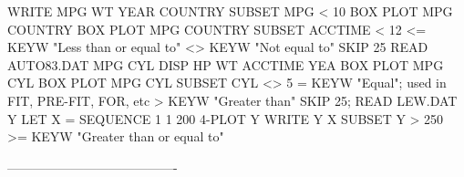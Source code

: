                                   WRITE MPG WT YEAR COUNTRY SUBSET MPG < 10
                                  BOX PLOT MPG COUNTRY
                                  BOX PLOT MPG COUNTRY SUBSET ACCTIME < 12
<=                          KEYW  "Less than or equal to"
<>                          KEYW  "Not equal to"
                                  SKIP 25
                                  READ AUTO83.DAT MPG CYL DISP HP WT ACCTIME YEA
                                  BOX PLOT MPG CYL
                                  BOX PLOT MPG CYL SUBSET CYL <> 5
=                           KEYW  "Equal"; used in FIT, PRE-FIT, FOR, etc
>                           KEYW  "Greater than"
                                  SKIP 25; READ LEW.DAT Y
                                  LET X = SEQUENCE 1 1 200
                                  4-PLOT Y
                                  WRITE Y X SUBSET Y > 250
>=                          KEYW  "Greater than or equal to"
 
----------------------------------------
